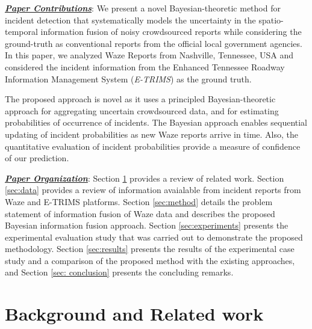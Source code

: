 \documentclass[conference]{IEEEtran}
\begin{document}
\textbf{\underline{\textit{Paper Contributions}}}: We present a novel Bayesian-theoretic method for incident detection that systematically models the uncertainty in the spatio-temporal information fusion of noisy crowdsourced reports while considering the ground-truth as conventional reports from the official local government agencies. In this paper, we analyzed Waze Reports from Nashville, Tennessee, USA and considered the incident information from the Enhanced Tennessee Roadway Information Management System (\textit{E-TRIMS}) as the ground truth.    

The proposed approach is novel as it uses a principled Bayesian-theoretic approach for aggregating uncertain crowdsourced data, and for estimating probabilities of occurrence of incidents. The Bayesian approach enables sequential updating of incident probabilities as new Waze reports arrive in time. Also, the quantitative evaluation of incident probabilities provide a measure of confidence of our prediction. 




\textbf{\underline{\textit{Paper Organization}}}:
Section \ref{sec:related} provides a review of related work. Section \ref{sec:data} provides a review of information avaialable from incident reports from Waze and E-TRIMS platforms. Section \ref{sec:method} details the problem statement of information fusion of Waze data and describes the proposed Bayesian information fusion approach. Section \ref{sec:experiments} presents the experimental evaluation study that was carried out to demonstrate the proposed methodology. Section \ref{sec:results} presents the results of the experimental case study and a comparison of the proposed method with the existing approaches, and Section \ref{sec: conclusion} presents the concluding remarks. 
\section{Background and Related work}
\label{sec:related}
\end{document}
